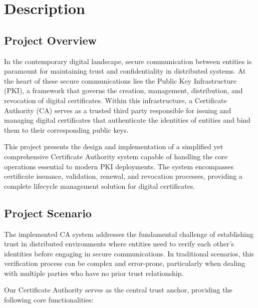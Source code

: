 \chapter{Description}

\section{Project Overview}

In the contemporary digital landscape, secure communication between entities is paramount for maintaining trust and confidentiality in distributed systems. At the heart of these secure communications lies the Public Key Infrastructure (PKI), a framework that governs the creation, management, distribution, and revocation of digital certificates. Within this infrastructure, a Certificate Authority (CA) serves as a trusted third party responsible for issuing and managing digital certificates that authenticate the identities of entities and bind them to their corresponding public keys.

This project presents the design and implementation of a simplified yet comprehensive Certificate Authority system capable of handling the core operations essential to modern PKI deployments. The system encompasses certificate issuance, validation, renewal, and revocation processes, providing a complete lifecycle management solution for digital certificates.

\section{Project Scenario}

The implemented CA system addresses the fundamental challenge of establishing trust in distributed environments where entities need to verify each other's identities before engaging in secure communications. In traditional scenarios, this verification process can be complex and error-prone, particularly when dealing with multiple parties who have no prior trust relationship.

Our Certificate Authority serves as the central trust anchor, providing the following core functionalities:


